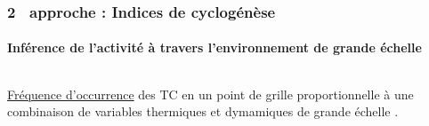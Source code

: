 \documentclass[aspectratio=169, usepdftitle=false, xcolor={dvipsnames}, 9pt,table]{beamer}
\begin{document}
\begin{frame}[t]
    \frametitle{2\ieme~ approche : Indices de cyclogénèse}
    \framesubtitle{Inférence de l'activité à travers l'environnement de grande échelle}
    \begin{columns}[t]
        \begin{column}{0.66\textwidth}
            \begin{definition}
                \scriptsize
                \underline{Fréquence d'occurrence} des TC en un point de grille proportionnelle à une \mbox{combinaison} de variables \alert{thermiques} et
                \mbox{\alert{dymamiques}} de grande échelle \parencite{gray_tropical_1975}.
            \end{definition}
            \begin{columns}[t]
                \setlength{\leftmargini}{2ex}
                \begin{column}{0.45\textwidth}
                \end{column}
                \begin{column}{0.45\textwidth}
\end{column}
\end{columns}
\end{column}
\end{columns}
\end{frame}
\end{document}
